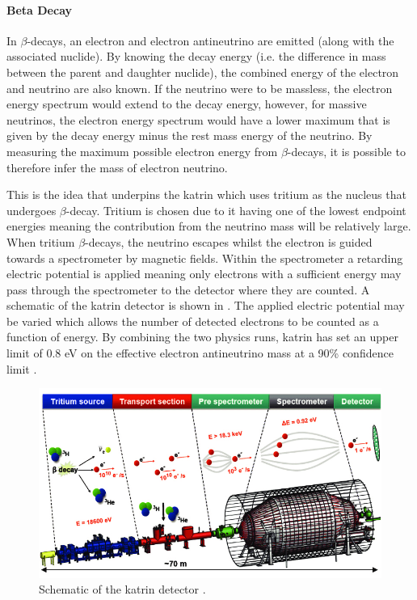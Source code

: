 \paragraph{Beta Decay}
In $\beta$-decays, an electron and electron antineutrino are emitted (along with the associated nuclide). By knowing the decay energy (i.e. the difference in mass between the parent and daughter nuclide), the combined energy of the electron and neutrino are also known. If the neutrino were to be massless, the electron energy spectrum would extend to the decay energy, however, for massive neutrinos, the electron energy spectrum would have a lower maximum that is given by the decay energy minus the rest mass energy of the neutrino. By measuring the maximum possible electron energy from $\beta$-decays, it is possible to therefore infer the mass of electron neutrino. 

This is the idea that underpins the \gls{katrin} which uses tritium as the nucleus that undergoes $\beta$-decay. Tritium is chosen due to it having one of the lowest endpoint energies meaning the contribution from the neutrino mass will be relatively large. When tritium $\beta$-decays, the neutrino escapes whilst the electron is guided towards a spectrometer by magnetic fields. Within the spectrometer a retarding electric potential is applied meaning only electrons with a sufficient energy may pass through the spectrometer to the detector where they are counted. A schematic of the \gls{katrin} detector is shown in . The applied electric potential may be varied which allows the number of detected electrons to be counted as a function of energy. By combining the two physics runs, \gls{katrin} has set an upper limit of 0.8 eV on the effective electron antineutrino mass at a 90\% confidence limit \cite{First_direct_neutrino_mass_measurement_with_sub-eV_sensitivity}.

\begin{figure}[h!]
    \centering
    \includegraphics[width = \hugefigwidth]{figures-chap2/Schematics-of-the-Katrin-experiment.png}
    \caption[Schematic of the \gls{katrin} detector.]{Schematic of the \gls{katrin} detector \cite{KATRIN_detector_figure}.}
    \label{fig:katrin_detector}
\end{figure}

